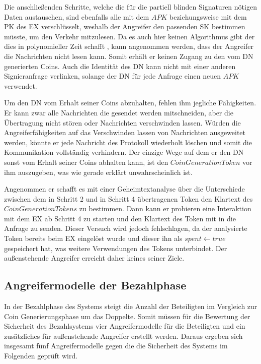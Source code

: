 \documentclass[
	fontsize=11pt,
	headings=small,
	parskip=half,           %
	bibliography=totoc,
	numbers=noenddot,       %
	open=any,               %
]{scrreprt}
\begin{document}
Die anschließenden Schritte, welche die für die partiell blinden Signaturen nötigen Daten austauschen, sind ebenfalls alle mit dem $APK$ beziehungsweise mit dem PK des EX verschlüsselt, weshalb der Angreifer den passenden SK bestimmen müsste, um den Verkehr mitzulesen. Da es auch hier keinen Algorithmus gibt der dies in polynomieller Zeit schafft \cite{ecc-bos2009security}, kann angenommen werden, dass der Angreifer die Nachrichten nicht lesen kann. Somit erhält er keinen Zugang zu den vom DN generierten Coins. Auch die Identität des DN kann nicht mit einer anderen Signieranfrage verlinken, solange der DN für jede Anfrage einen neuen $APK$ verwendet.

Um den DN vom Erhalt seiner Coins abzuhalten, fehlen ihm jegliche Fähigkeiten. Er kann zwar alle Nachrichten die gesendet werden mitschneiden, aber die Übertragung nicht stören oder Nachrichten verschwinden lassen. Würden die Angreiferfähigkeiten auf das Verschwinden lassen von Nachrichten ausgeweitet werden, könnte er jede Nachricht des Protokoll wiederholt löschen und somit die Kommunikation vollständig verhindern. Der einzige Wege auf dem er den DN sonst vom Erhalt seiner Coins abhalten kann, ist den $CoinGenerationToken$ vor ihm auszugeben, was wie gerade erklärt unwahrscheinlich ist.

Angenommen er schafft es mit einer Geheimtextanalyse über die Unterschiede zwischen dem in Schritt 2 und in Schritt 4 übertragenen Token den Klartext des $CoinGenerationTokens$ zu bestimmen. Dann kann er probieren eine Interaktion mit dem EX ab Schritt 4 zu starten und den Klartext des Token mit in die Anfrage zu senden. Dieser Versuch wird jedoch fehlschlagen, da der analysierte Token bereits beim EX eingelöst wurde und dieser ihn als $spent\leftarrow true$ gespeichert hat, was weitere Verwendungen des Tokens unterbindet. Der außenstehende Angreifer erreicht daher keines seiner Ziele.

\subsection{Angreifermodelle der Bezahlphase}
\label{subsec:adversaryPayment}
In der Bezahlphase des Systems steigt die Anzahl der Beteiligten im Vergleich zur Coin Generierungsphase um das Doppelte. Somit müssen für die Bewertung der Sicherheit des Bezahlsystems vier Angreifermodelle für die Beteiligten und ein zusätzliches für außenstehende Angreifer erstellt werden. Daraus ergeben sich insgesamt fünf Angreifermodelle gegen die die Sicherheit des Systems im Folgenden geprüft wird.
\end{document}
